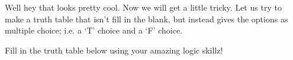 \documentclass{ximera}
\begin{document}
Well hey that looks pretty cool. Now we will get a little tricky. Let us try to make a truth table that isn't fill in the blank, but instead gives the options as multiple choice; i.e. a `T' choice and a `F' choice.

\begin{problem}
Fill in the truth table below using your amazing logic skillz!

\end{problem}
\end{document}
